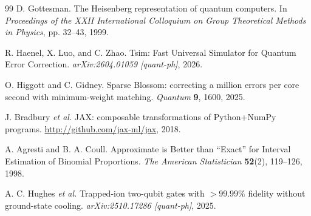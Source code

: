 \documentclass[a4paper]{article}
\begin{document}
\begin{thebibliography}{99}
D. Gottesman.
\newblock The Heisenberg representation of quantum computers.
\newblock In \textit{Proceedings of the XXII International Colloquium on Group Theoretical Methods in Physics}, pp. 32--43, 1999.

R. Haenel, X. Luo, and C. Zhao.
\newblock Tsim: Fast Universal Simulator for Quantum Error Correction.
\newblock \textit{arXiv:2604.01059 [quant-ph]}, 2026.

O. Higgott and C. Gidney.
\newblock Sparse Blossom: correcting a million errors per core second with minimum-weight matching.
\newblock \textit{Quantum} \textbf{9}, 1600, 2025.

J. Bradbury \textit{et al.}
\newblock JAX: composable transformations of Python+NumPy programs.
\newblock \url{http://github.com/jax-ml/jax}, 2018.

A. Agresti and B. A. Coull.
\newblock Approximate is Better than ``Exact'' for Interval Estimation of Binomial Proportions.
\newblock \textit{The American Statistician} \textbf{52}(2), 119--126, 1998.

A. C. Hughes \textit{et al.}
\newblock Trapped-ion two-qubit gates with $>99.99\%$ fidelity without ground-state cooling.
\newblock \textit{arXiv:2510.17286 [quant-ph]}, 2025.

\end{thebibliography}
\end{document}
